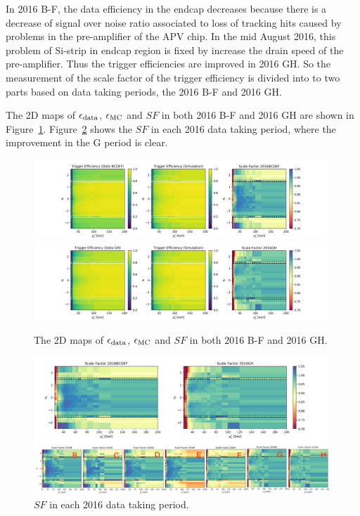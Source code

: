 In 2016 B-F, the data efficiency in the endcap decreases because there is a decrease of signal over noise ratio associated 
to loss of	tracking hits caused by problems in the pre-amplifier of the APV chip. 
In the mid August 2016, this problem of Si-strip in endcap region is fixed by increase the drain speed of the pre-amplifier. Thus the 
trigger efficiencies are improved in 2016 GH. So the measurement of the scale factor of the trigger efficiency is divided into to
two parts based on data taking periods, the 2016 B-F and 2016 GH.

The 2D maps of $\epsilon_{\rm{data}}$, $\epsilon_{\rm{MC}}$ and $SF$ in both 2016 B-F and 2016 GH are shown in Figure~\ref{fig:appendix:ele27SF}. Figure~\ref{fig:appendix:ele27SFperiods} 
shows the $SF$ in each 2016 data taking period, where the improvement in the G period is clear.



\begin{figure}
    \centering
    \includegraphics[width=0.99\textwidth]{chapters/Appendix/sectionEleTrigger/figures/eff2d_BCDEF.png}
    \includegraphics[width=0.99\textwidth]{chapters/Appendix/sectionEleTrigger/figures/eff2d_GH.png}
    \caption{The 2D maps of $\epsilon_{\rm{data}}$, $\epsilon_{\rm{MC}}$ and $SF$ in both 2016 B-F and 2016 GH.}
    \label{fig:appendix:ele27SF}
\end{figure}



\begin{figure}
    \centering
    \includegraphics[width=0.99\textwidth, trim=0 0 0 1.1\textwidth, clip]{chapters/Appendix/sectionEleTrigger/figures/eTrSF_value.png}
    \caption{$SF$ in each 2016 data taking period.}
    \label{fig:appendix:ele27SFperiods}
\end{figure}





